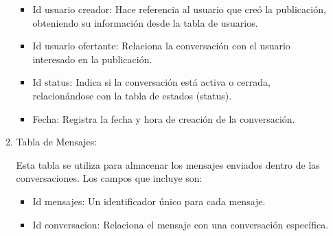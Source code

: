 \documentclass[11pt, a4paper, oneside]{book}
\begin{document}
\begin{itemize}
\begin{enumerate}
\begin{itemize}
\end{itemize} 

  \begin{itemize} 

      \item Id usuario creador: Hace referencia al usuario que creó la publicación, obteniendo su información desde la tabla de usuarios. 

  \end{itemize} 

  \begin{itemize} 

      \item Id usuario ofertante: Relaciona la conversación con el usuario interesado en la publicación. 

  \end{itemize} 

  \begin{itemize} 

      \item Id status: Indica si la conversación está activa o cerrada, relacionándose con la tabla de estados (status). 

  \end{itemize} 

  \begin{itemize} 

      \item Fecha: Registra la fecha y hora de creación de la conversación. 

  \end{itemize} 

 

 

\item Tabla de Mensajes: 

 

Esta tabla se utiliza para almacenar los mensajes enviados dentro de las conversaciones. Los campos que incluye son: 

 

\begin{itemize} 

    \item Id mensajes: Un identificador único para cada mensaje. 

\end{itemize} 

\begin{itemize} 

    \item Id conversacion: Relaciona el mensaje con una conversación específica. 


\end{itemize}
\end{enumerate}
\end{itemize}
\end{document}
